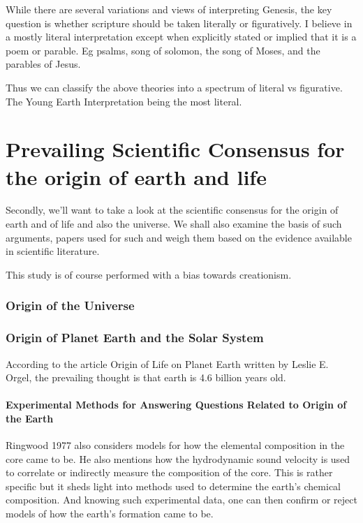 \documentclass[11]{article}
\begin{document}
While there are several variations and views of interpreting Genesis, the key question is whether scripture should be taken literally or figuratively. I believe in a mostly literal interpretation except when explicitly stated or implied that it is a poem or parable. Eg psalms, song of solomon, the song of Moses, and the parables of Jesus. 

Thus we can classify the above theories into a spectrum of literal vs figurative. The Young Earth Interpretation being the most literal. 

\part{Prevailing Scientific Consensus for the origin of earth and life}

Secondly, we'll want to take a look at the scientific consensus for the origin of earth and of life and also the universe. We shall also examine the basis of such arguments, papers used for such and weigh them based on the evidence available in scientific literature.

This study is of course performed with a bias towards creationism.

\section{Origin of the Universe}

\section{Origin of Planet Earth and the Solar System}

According to the article Origin of Life on Planet Earth written by Leslie E. Orgel, the prevailing thought is that earth is 4.6 billion years old. 

\subsection{Experimental Methods for Answering Questions Related to Origin of the Earth}

Ringwood 1977 also considers models for how the elemental composition in the core came to be. He also mentions how the hydrodynamic sound velocity is used to correlate or indirectly measure the composition of the core. This is rather specific but it sheds light into methods used to determine the earth's chemical composition. And knowing such experimental data, one can then confirm or reject models of how the earth's formation came to be. 
\end{document}
